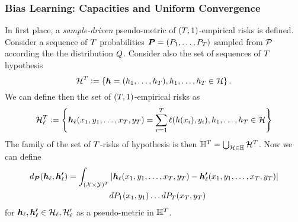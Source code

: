 \subsubsection*{Bias Learning: Capacities and Uniform Convergence}
In first place, a \emph{sample-driven} pseudo-metric of $(T, 1)$-empirical risks is defined.
Consider a sequence of $T$ probabilities $\bm{P} = (P_1, \ldots, P_T)$ sampled from $\mathcal{P}$ according the the distribution $Q$. 
Consider also the set of sequences of $T$ hypothesis 
$$\mathcal{H}^T \vcentcolon= \left\{ \bm{h} = (h_1, \ldots, h_T) , h_1, \ldots, h_T \in \mathcal{H}\right\} .$$
We can define then the set of $(T, 1)$-empirical risks as 
$$\mathcal{H}^T_\ell \vcentcolon= \left\{ \bm{h}_\ell(x_1, y_1, \ldots, x_T, y_T) = \sum_{r=1}^T \ell(h(x_i), y_i) , h_1, \ldots, h_T \in \mathcal{H}\right\} $$
The family of the set of $T$-risks of hypothesis is then $\mathbb{H}^{T} = \bigcup_{\mathcal{H} \in \mathbb{H}} \mathcal{H}^T$. Now we can define
\begin{equation}
    \nonumber
    \begin{aligned}
        d_{\bm{P}}(\bm{h}_\ell, \bm{h'}_\ell) = \int_{(\mathcal{X} \times \mathcal{Y})^{T}} &\left|\bm{h}_\ell(x_1, y_1, \ldots, x_T, y_T) - \bm{h'}_\ell(x_1, y_1, \ldots, x_T, y_T)\right| \\ 
        & d{P_1}(x_1, y_1) \ldots d{P_T}(x_T, y_T)
    \end{aligned}
\end{equation}
for $\bm{h}_\ell, \bm{h'}_\ell \in \mathcal{H}_\ell, \mathcal{H}'_\ell$ as a pseudo-metric in $\mathbb{H}^T$.
%

